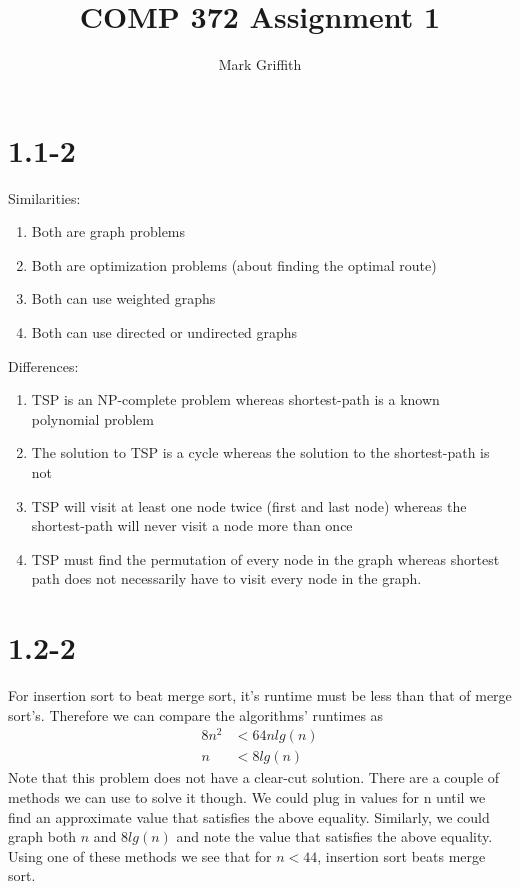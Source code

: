 \documentclass{article}
\begin{document}
\title{COMP 372 Assignment 1}
\author{Mark Griffith}

\maketitle


\section{1.1-2}
Similarities:
\begin{enumerate}
  \item Both are graph problems
  \item	Both are optimization problems (about finding the optimal route)
  \item Both can use weighted graphs
  \item Both can use directed or undirected graphs
\end{enumerate}
Differences:
\begin{enumerate}
  \item TSP is an NP-complete problem whereas shortest-path is a known polynomial problem
  \item The solution to TSP is a cycle whereas the solution to the shortest-path is not
  \item TSP will visit at least one node twice (first and last node) whereas the shortest-path will never visit a node more than once
  \item TSP must find the permutation of every node in the graph whereas shortest
  path does not necessarily have to visit every node in the graph.
\end{enumerate}

\section{1.2-2}
For insertion sort to beat merge sort, it’s runtime must be less than that of merge sort’s. Therefore we can compare the algorithms’ runtimes as
\begin{align*}
  8n^2 &< 64nlg(n)\\
  n &< 8lg(n)
\end{align*}
Note that this problem does not have a clear-cut solution.
There are a couple of methods we can use to solve it though.
We could plug in values for n until we find an approximate value
that satisfies the above equality. Similarly, we could graph both $n$ and
$8lg(n)$ and note the value that satisfies the above equality.
Using one of these methods we see that for $n < 44$, insertion
sort beats merge sort.
\end{document}
